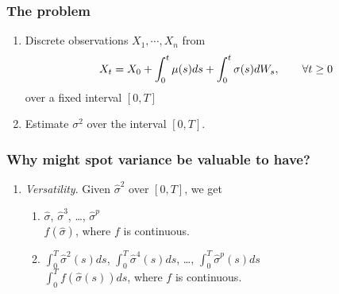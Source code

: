 \documentclass[fleqn]{beamer}
\begin{document}
\begin{frame}
\frametitle{The problem}
\begin{enumerate}
  \item Discrete observations $X_1, \cdots, X_n$ from 
    \begin{align}
      X_t = X_0 + \int_0^t \mu(s) d s + \int_0^t \sigma(s) d W_s, \qquad \forall t \ge 0\notag
      \label{}
    \end{align} over a fixed interval $[0,T]$
  \item Estimate $\sigma^2$ over the interval $[0,T]$.
\end{enumerate}
\end{frame}
\begin{frame}
  \frametitle{Why might spot variance be valuable to have?}
  \begin{enumerate}
    \item \emph{Versatility}. Given $\hat{\sigma}^2$ over $[0,T]$, we get 
      \begin{enumerate}
        \item $\hat{\sigma}$, $\hat{\sigma}^3$, \ldots, $\hat{\sigma}^p$\\
          $f(\hat{\sigma})$, where $f$ is continuous.
        \item $\int_0^T\hat{\sigma}^2(s) d s$,  $\int_0^T\hat{\sigma}^4(s) d s$, \ldots, $\int_0^T\hat{\sigma}^p(s) d s$\\
            $\int_0^Tf(\hat{\sigma}(s)) d s$, where $f$ is continuous.
      \end{enumerate}
  \end{enumerate}
\end{frame}
\end{document}
